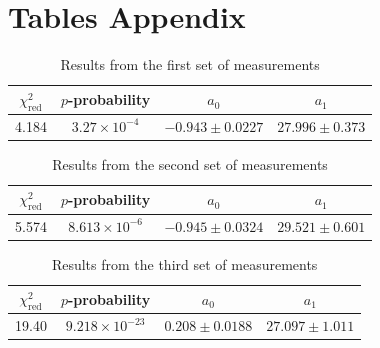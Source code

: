 \documentclass[12pt]{article}
\begin{document}
\clearpage

\section{Tables Appendix}
\label{sec:tables_app}
\FloatBarrier

\begin{table}[H]
  \centering
  \begin{tabular}{|c|c|c|c|}
    \hline
    $\chi^2_{\mathrm{red}}$ & $p$-probability      & $a_0$             & $a_1$             \\ \hline
    4.184                   & $3.27\times10^{-4}$  & $-0.943\pm0.0227$ & $27.996\pm0.373$  \\ \hline
  \end{tabular}
  \caption{Results from the first set of measurements}
  \label{tab:first_set}
\end{table}

\begin{table}[H]
  \centering
  \begin{tabular}{|c|c|c|c|}
    \hline
    $\chi^2_{\mathrm{red}}$ & $p$-probability      & $a_0$             & $a_1$             \\ \hline
    5.574                   & $8.613\times10^{-6}$ & $-0.945\pm0.0324$ & $29.521\pm0.601$  \\ \hline
  \end{tabular}
  \caption{Results from the second set of measurements}
  \label{tab:second_set}
\end{table}

\begin{table}[H]
  \centering
  \begin{tabular}{|c|c|c|c|}
    \hline
    $\chi^2_{\mathrm{red}}$ & $p$-probability            & $a_0$              & $a_1$             \\ \hline
    19.40                   & $9.218\times10^{-23}$      & $0.208\pm0.0188$   & $27.097\pm1.011$  \\ \hline
  \end{tabular}
  \caption{Results from the third set of measurements}
  \label{tab:third_set}
\end{table}

\FloatBarrier
\end{document}
